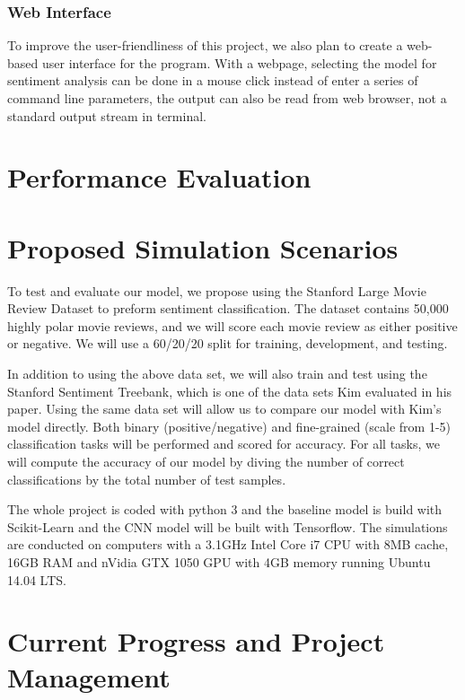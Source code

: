 \documentclass[conference]{IEEEtran}
\begin{document}
\subsubsection{Web Interface}
\label{model:stretch:web}
    To improve the user-friendliness of this project, we also plan to create a 
    web-based user interface for the program. With a webpage, selecting
    the model for sentiment analysis can be done in a mouse click instead of 
    enter a series of command line parameters, the output can also
    be read from web browser, not a standard output stream in terminal. 

\section{Performance Evaluation}
\label{performance}


\section{Proposed Simulation Scenarios}
\label{scenarios}
    To test and evaluate our model, we propose using the Stanford Large Movie Review
    Dataset to preform sentiment classification\cite{maas2011learning}.
    The dataset contains 50,000 highly polar
    movie reviews, and we will score each movie review as either positive or
    negative. We will use a 60/20/20 split for training, development, and testing.

    In addition to using the above data set, we will also train and test using the 
    Stanford Sentiment Treebank, which is one of the data sets Kim evaluated in 
    his paper\cite{sentimenttreebank}. Using the same data set
    will allow us to compare our model with Kim's model directly. 
    Both binary (positive/negative) and fine-grained (scale from 1-5) 
    classification tasks will be performed and scored for accuracy.
    For all tasks, we will compute the accuracy of our model by diving the 
    number of correct classifications by the total number of test samples.

    The whole project is coded with python 3 and the baseline model
    is build with Scikit-Learn\cite{scikit-learn} and the CNN model
    will be built with Tensorflow\cite{tensorflow2015-whitepaper}. The 
    simulations are conducted on computers with a 3.1GHz Intel Core i7 
    CPU with 8MB cache, 16GB RAM and nVidia GTX 1050 GPU with 4GB memory 
    running Ubuntu 14.04 LTS.

\section{Current Progress and Project Management}
\label{manage}
\end{document}
